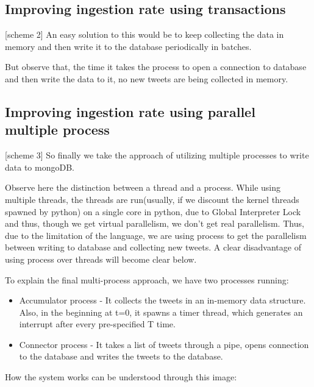 \documentclass[letterpaper,10pt,english]{sphinxmanual}
\begin{document}
\subsection{Improving ingestion rate using transactions}
\label{\detokenize{mongoDB_data_ingestion:improving-ingestion-rate-using-transactions}}
{[}scheme 2{]} An easy solution to this would be to keep collecting the data in memory and then write it to the database periodically in batches.

But observe that, the time it takes the process to open a connection to database and then write the data to it, no new tweets are being collected in memory.


\subsection{Improving ingestion rate using parallel multiple process}
\label{\detokenize{mongoDB_data_ingestion:improving-ingestion-rate-using-parallel-multiple-process}}
{[}scheme 3{]} So finally we take the approach of utilizing multiple processes to write data to mongoDB.

Observe here the distinction between a thread and a process.
While using multiple threads, the threads are run(usually, if we discount the kernel threads spawned by python) on a single core in python, due to Global Interpreter Lock and thus, though we get virtual parallelism,
we don’t get real parallelism. Thus, due to the limitation of the language, we are using process to get the parallelism between writing to database and collecting new tweets.
A clear disadvantage of using process over threads will become clear below.

To explain the final multi-process approach, we have two processes running:
\begin{itemize}
\item {} 
Accumulator process - It collects the tweets in an in-memory data structure. Also, in the beginning at t=0, it spawns a timer thread, which generates an interrupt after every pre-specified T time.

\item {} 
Connector process - It takes a list of tweets through a pipe, opens connection to the database and writes the tweets to the database.

\end{itemize}

How the system works can be understood through this image:

\noindent{}
\end{document}
